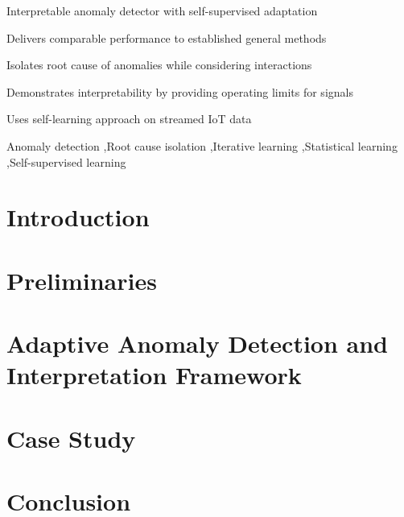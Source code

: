 \documentclass[preprint,12pt,authoryear]{elsarticle}
\begin{document}
\begin{frontmatter}
\begin{highlights}
\item Interpretable anomaly detector with self-supervised adaptation
\item Delivers comparable performance to established general methods
\item Isolates root cause of anomalies while considering interactions
\item Demonstrates interpretability by providing operating limits for signals
\item Uses self-learning approach on streamed IoT data
\end{highlights}

\begin{keyword}
Anomaly detection \sep Root cause isolation \sep Iterative learning \sep Statistical learning \sep Self-supervised learning
\end{keyword}

\end{frontmatter}

\linenumbers

\section{Introduction}
\label{Introduction}


\section{Preliminaries}
\label{Preliminaries}


\section{Adaptive Anomaly Detection and Interpretation Framework}
\label{Proposed Method}


\section{Case Study}
\label{Case Study}


\section{Conclusion}
\label{Conclusion}

\end{document}
